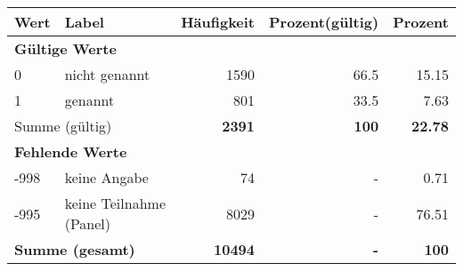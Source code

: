      \begin{longtable}{lXrrr}
     \toprule
     \textbf{Wert} & \textbf{Label} & \textbf{Häufigkeit} & \textbf{Prozent(gültig)} & \textbf{Prozent} \\
     \endhead
     \midrule
     \multicolumn{5}{l}{\textbf{Gültige Werte}}\\

     0 &
     \multicolumn{1}{X}{ nicht genannt   } &


       \num{1590} &
       \num[round-mode=places,round-precision=2]{66.5} &
         \num[round-mode=places,round-precision=2]{15.15} \\

     1 &
     \multicolumn{1}{X}{ genannt   } &


       \num{801} &
       \num[round-mode=places,round-precision=2]{33.5} &
         \num[round-mode=places,round-precision=2]{7.63} \\
     \midrule
     \multicolumn{2}{l}{Summe (gültig)} &
       \textbf{\num{2391}} &
     \textbf{\num{100}} &
       \textbf{\num[round-mode=places,round-precision=2]{22.78}} \\
     \multicolumn{5}{l}{\textbf{Fehlende Werte}}\\
       -998 &
       keine Angabe &
         \num{74} &
        - &
         \num[round-mode=places,round-precision=2]{0.71} \\
       -995 &
       keine Teilnahme (Panel) &
         \num{8029} &
        - &
         \num[round-mode=places,round-precision=2]{76.51} \\
     \midrule
     \multicolumn{2}{l}{\textbf{Summe (gesamt)}} &
          \textbf{\num{10494}} &
        \textbf{-} &
        \textbf{\num{100}} \\
     \bottomrule
     \end{longtable}
     
